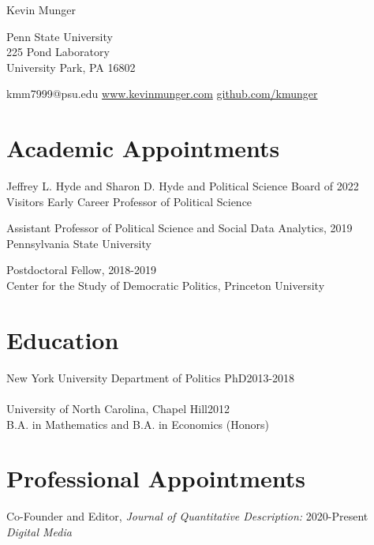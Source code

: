 \documentclass[margin]{res}
\begin{document}
 
\begin{flushleft}
	\huge{Kevin Munger} 
\end{flushleft} 
 \vspace{-5em}
 \begin{flushright}
{Penn State University \\ 225  Pond Laboratory\\ University Park, PA 16802}
 \end{flushright}
 \vspace{-1em}
kmm7999@psu.edu \hspace{2em} \href{www.kevinmunger.com}{www.kevinmunger.com} \hspace{2em} \href{https://github.com/kmunger}{github.com/kmunger}




\section{Academic Appointments} 

Jeffrey L. Hyde and Sharon D. Hyde and Political Science Board of \hfill 2022 \\ Visitors Early Career Professor of Political Science 

Assistant Professor of Political Science and Social Data Analytics,  \hfill 2019 \\
  Pennsylvania State University 


  
Postdoctoral Fellow,  \hfill 2018-2019 \\
Center for the Study of Democratic Politics, Princeton University 


\section{Education} 
New York University Department of Politics PhD\hfill 2013-2018   \\
\\
University of North Carolina, Chapel Hill\hfill 2012\\
B.A. in Mathematics and B.A. in Economics (Honors)


\section{Professional Appointments}
Co-Founder and Editor, \textit{Journal of Quantitative Description:} \hfill 2020-Present\\
\textit{ Digital Media}
\end{document}
